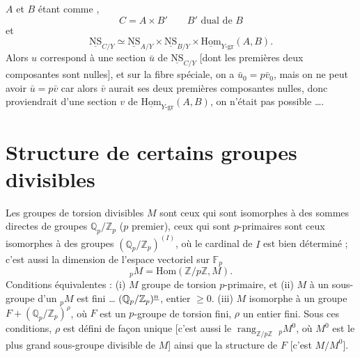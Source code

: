 \documentclass[11pt,a4paper]{article}
\begin{document}
$A$ et $B$ étant comme , 
\[
C = A \times B' \qquad B' \text{ dual de } B
\]
et
\[
\underline{\mathrm{NS}}_{C/Y} \simeq \underline{\mathrm{NS}}_{A/Y} \times \underline{\mathrm{NS}}_{B/Y} \times \underline{\mathrm{Hom}}_{Y\text{-gr}}(A, B) .
\]
Alors $u$ correspond à une section $\bar u$ de $\underline{\mathrm{NS}}_{C/Y}$ [dont les premières deux composantes sont nulles], et sur la fibre  spéciale, on a $\bar u_0 = p\bar v_0$, mais on ne peut avoir $\bar u = p\bar v$ car alors $\bar v$  aurait ses deux premières composantes nulles, donc proviendrait d'une section $v$ de $\underline{\mathrm{Hom}}_{Y\text{-gr}}(A, B)$, \ill{} on   n'était pas possible ….

\section{Structure de certains groupes divisibles}

\struck{\ill{}} Les \struck{\ill{}} groupes de torsion divisibles $M$ sont ceux qui sont isomorphes à des sommes directes de groupes $\mathbb{Q}_p/\mathbb{Z}_p$ ($p$ premier), ceux qui sont $p$-primaires sont ceux isomorphes à des \struck{\ill{}} \struck{\ill{} \ill{}} groupes $(\mathbb{Q}_p/\mathbb{Z}_p)^{(I)}$, où le cardinal de $I$ est bien déterminé ; c'est aussi la dimension de l'espace vectoriel sur $\mathbb{F}_p$
\[
{}_pM = \mathrm{Hom}(\mathbb{Z}/p\mathbb{Z}, M) .
\]
Conditions équivalentes : (i) $M$ groupe de torsion $p$-primaire, et (ii) $M$  à un sous-groupe d'un \ill{} \ill{} \ill{} \ill{} ${}_pM$ est fini
… $(\mathbb{Q}_p/\mathbb{Z}_p)^{\uncertain{n}}$, \struck{\ill{}} \ill{} \ill{} \ill{} \ill{} entier $\geq 0$. (iii) $M$ isomorphe à un groupe $F + (\mathbb{Q}_p/\mathbb{Z}_p)^{\rho}$, où $F$ est un $p$-groupe de torsion fini,  $\rho$ un entier fini. Sous ces conditions, $\rho$ est défini de façon unique [c'est aussi le $\operatorname{rang}_{\mathbb{Z}/p\mathbb{Z}}$  ${}_pM^0$, où $M^0$ est le plus grand sous-groupe divisible de $M$] ainsi que la structure de $F$ [c'est $M/M^0$].
\end{document}
